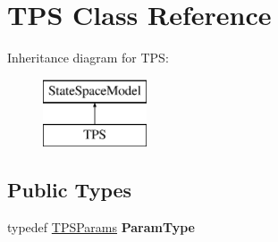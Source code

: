 \hypertarget{classTPS}{\section{T\-P\-S Class Reference}
\label{classTPS}
}
Inheritance diagram for T\-P\-S\-:\begin{figure}[H]
\begin{center}
\leavevmode
\includegraphics[height=2.000000cm]{classTPS}
\end{center}
\end{figure}
\subsection*{Public Types}
\begin{DoxyCompactItemize}
\item 
\hypertarget{classTPS_af8617e965864c2b37aeb56e2bbab50cd}{typedef \hyperlink{structTPSParams}{T\-P\-S\-Params} {\bfseries Param\-Type}}\label{classTPS_af8617e965864c2b37aeb56e2bbab50cd}

\end{DoxyCompactItemize}
